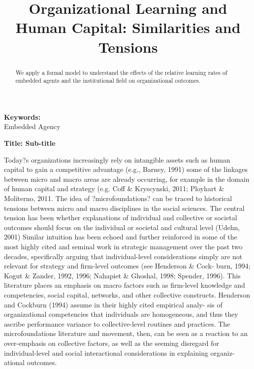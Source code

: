 \documentclass[12pt,letterpaper]{article}
\begin{document}
\title{Organizational Learning and Human Capital: Similarities and Tensions}
\date{}
\maketitle

\begin{abstract} 
\normalsize 
We apply a formal model to understand the effects of the relative learning rates of embedded agents and the institutional field on organizational outcomes. 
\end{abstract}


{\textbf{Keywords:} \\\indent Embedded Agency}

\newpage
\pagestyle{fancy}
\fancyhf{}
\rhead{\thepage}

\begin{center}
\textbf{Title: Sub-title}
\end{center}


Today?s organizations increasingly rely on intangible assets such as human capital to gain a competitive advantage (e.g., Barney, 1991)
some of the linkages between micro and macro areas are already occurring, for example in the domain of human capital and strategy (e.g. Coff \& Kryscynski, 2011; Ployhart \& Moliterno, 2011. The idea of ?microfoundations? can be traced to historical tensions between micro and macro disciplines in the social sciences. The central tension has been whether explanations of individual and collective or societal outcomes should focus on the individual or societal and cultural level (Udehn, 2001)
Similar intuition has been echoed and further reinforced in some of the most highly cited and seminal work in strategic management over the past two decades, specifically arguing that individual-level considerations simply are not relevant for strategy and firm-level outcomes (see Henderson \& Cock- burn, 1994; Kogut \& Zander, 1992, 1996; Nahapiet \& Ghoshal, 1998; Spender, 1996). This literature places an emphasis on macro factors such as firm-level knowledge and competencies, social capital, networks, and other collective constructs. Henderson and Cockburn (1994) assume in their highly cited empirical analy- sis of organizational competencies that individuals are homogeneous, and thus they ascribe performance variance to collective-level routines and practices. The microfoundations literature and movement, then, can be seen as a reaction to an over-emphasis on collective factors, as well as the seeming disregard for individual-level and social interactional considerations in explaining organiz- ational outcomes.
\end{document}
